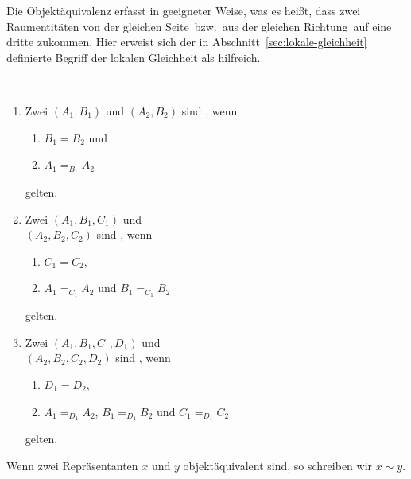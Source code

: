     
    Die Objektäquivalenz erfasst in geeigneter Weise, was es heißt, dass zwei Raumentitäten \glqq von der gleichen Seite\grqq\ bzw.\ \glqq aus der gleichen Richtung\grqq\ auf eine dritte zukommen. 
    Hier erweist sich der in Abschnitt~\ref{sec:lokale-gleichheit} definierte Begriff der lokalen Gleichheit als hilfreich.

    \begin{dfn}\label{dfn:objektaequivalenz}\ \vspace{0pt}

        \begin{enumerate}
            \item Zwei  $(A_1,B_1)$ und $(A_2,B_2)$ sind , wenn 
                \begin{enumerate}
                    \item $B_1 = B_2$ und
                    \item $A_1 =_{B_1} A_2$
                \end{enumerate}
                gelten.
            \item Zwei  $(A_1,B_1,C_1)$ und \\
            $(A_2,B_2,C_2)$ sind , wenn 
                \begin{enumerate}
                    \item $C_1 = C_2$,
                    \item $A_1 =_{C_1} A_2$ und $B_1 =_{C_1} B_2$
                \end{enumerate}
                gelten.
            \item Zwei  $(A_1,B_1,C_1,D_1)$ und\\
                $(A_2,B_2,C_2,D_2)$ sind , wenn 
                \begin{enumerate}
                    \item $D_1 = D_2$,
                    \item $A_1 =_{D_1} A_2$, $B_1 =_{D_1} B_2$ und $C_1 =_{D_1} C_2$
                \end{enumerate}	
                gelten.		
        \end{enumerate}
        
        Wenn zwei Repräsentanten $x$ und $y$ objektäquivalent sind, so schreiben wir $x \sim y$.
        
    \end{dfn}
    
